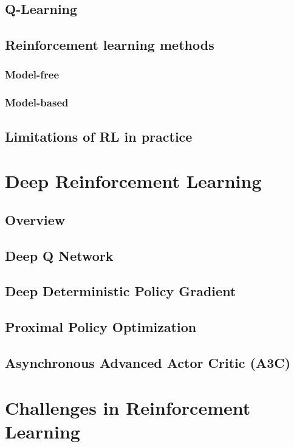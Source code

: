 \subsection{Q-Learning}
\subsection{Reinforcement learning methods}
\subsubsection{Model-free}
\subsubsection{Model-based}
\subsection{Limitations of RL in practice}




\section{Deep Reinforcement Learning}

\subsection{Overview}
\subsection{Deep Q Network}
\subsection{Deep Deterministic Policy Gradient}
\subsection{Proximal Policy Optimization}
\subsection{Asynchronous Advanced Actor Critic (\textbf{A3C})}


\section{Challenges in Reinforcement Learning}